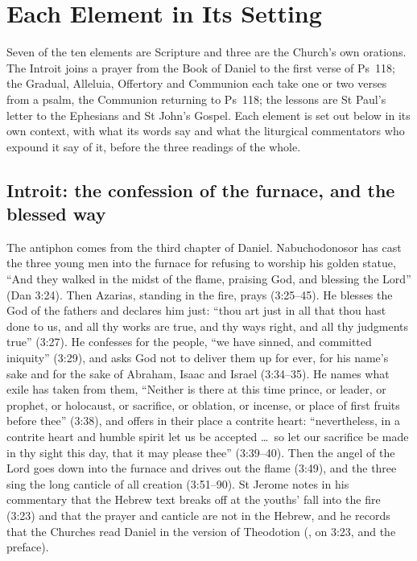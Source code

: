 \section{Each Element in Its Setting}
\label{sec:each-element}

Seven of the ten elements are Scripture and three are the Church's own
orations. The Introit joins a prayer from the Book of Daniel to the first verse
of Ps~118; the Gradual, Alleluia, Offertory and Communion each take one or two
verses from a psalm, the Communion returning to Ps~118; the lessons are St
Paul's letter to the Ephesians and St John's Gospel. Each element is set out
below in its own context, with what its words say and what the liturgical
commentators who expound it say of it, before the three readings of the whole.

\subsection{Introit: the confession of the furnace, and the blessed way}

The antiphon comes from the third chapter of Daniel. Nabuchodonosor has cast
the three young men into the furnace for refusing to worship his golden statue,
``And they walked in the midst of the flame, praising God, and blessing the
Lord'' (Dan 3:24). Then Azarias, standing in the fire, prays (3:25--45). He
blesses the God of the fathers and declares him just: ``thou art just in all
that thou hast done to us, and all thy works are true, and thy ways right, and
all thy judgments true'' (3:27). He confesses for the people, ``we have sinned,
and committed iniquity'' (3:29), and asks God not to deliver them up for ever,
for his name's sake and for the sake of Abraham, Isaac and Israel (3:34--35).
He names what exile has taken from them, ``Neither is there at this time
prince, or leader, or prophet, or holocaust, or sacrifice, or oblation, or
incense, or place of first fruits before thee'' (3:38), and offers in their
place a contrite heart: ``nevertheless, in a contrite heart and humble spirit
let us be accepted \dots\ so let our sacrifice be made in thy sight this day,
that it may please thee'' (3:39--40). Then the angel of the Lord goes down into
the furnace and drives out the flame (3:49), and the three sing the long
canticle of all creation (3:51--90). St Jerome notes in his commentary that the
Hebrew text breaks off at the youths' fall into the fire (3:23) and that the
prayer and canticle are not in the Hebrew, and he records that the Churches
read Daniel in the version of Theodotion (, on
3:23, and the preface).

